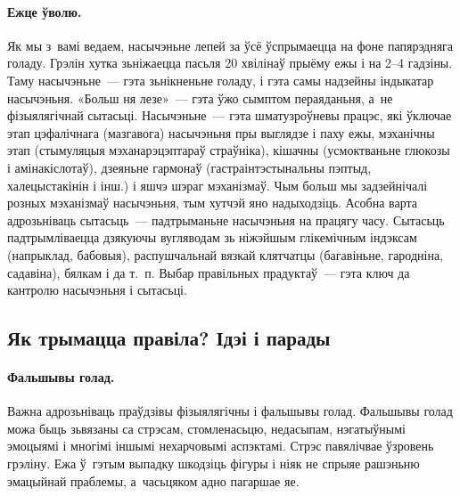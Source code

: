\paragraph{Ежце ўволю.}
Як мы з~вамі ведаем, насычэньне лепей за ўсё ўспрымаецца на фоне папярэдняга голаду. Грэлін хутка зьніжаецца пасьля 20 хвілінаў прыёму ежы і на 2--4 гадзіны. Таму насычэньне~--- гэта зьнікненьне голаду, і гэта самы надзейны індыкатар насычэньня. «Больш ня лезе»~--- гэта ўжо сымптом пераяданьня, а~не фізыялягічнай сытасьці. Насычэньне~--- гэта шматузроўневы працэс, які ўключае этап цэфалічнага (мазгавога) насычэньня пры выглядзе і паху ежы, мэханічны этап (стымуляцыя мэханарэцэптараў страўніка), кішачны (усмоктваньне глюкозы і амінакіслотаў), дзеяньне гармонаў (гастраінтэстынальны пэптыд, халецыстакінін і інш.) і яшчэ шэраг мэханізмаў. Чым больш мы задзейнічалі розных мэханізмаў насычэньня, тым хутчэй яно надыходзіць. Асобна варта адрозьніваць сытасьць~--- падтрыманьне насычэньня на працягу часу. Сытасьць падтрымліваецца дзякуючы вугляводам зь ніжэйшым глікемічным індэксам (напрыклад, бабовыя), распушчальнай вязкай клятчатцы (багавіньне, гародніна, садавіна), бялкам і да т.~п. Выбар правільных прадуктаў~--- гэта ключ да кантролю насычэньня і сытасьці.


\subsection{Як трымацца правіла? Ідэі і парады}

\paragraph{Фальшывы голад.}
Важна адрозьніваць праўдзівы фізыялягічны і фальшывы голад. Фальшывы голад можа быць зьвязаны са стрэсам, стомленасьцю, недасыпам, нэгатыўнымі эмоцыямі і многімі іншымі нехарчовымі аспэктамі. Стрэс павялічвае ўзровень грэліну. Ежа ў~гэтым выпадку шкодзіць фігуры і ніяк не спрыяе рашэньню эмацыйнай праблемы, а~часьцяком адно пагаршае яе.

